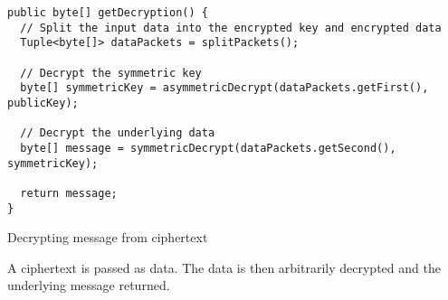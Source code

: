 \begin{listing}[H]
  \centering
  \begin{verbatim}
public byte[] getDecryption() {
  // Split the input data into the encrypted key and encrypted data
  Tuple<byte[]> dataPackets = splitPackets();

  // Decrypt the symmetric key
  byte[] symmetricKey = asymmetricDecrypt(dataPackets.getFirst(), publicKey);

  // Decrypt the underlying data
  byte[] message = symmetricDecrypt(dataPackets.getSecond(), symmetricKey);

  return message;
}
  \end{verbatim}
  \caption{
  	Decrypting message from ciphertext
  }{
  	A ciphertext is passed as data. The data is then arbitrarily decrypted and the underlying message returned.
  }
  \label{code:decrypt_data}
\end{listing}
